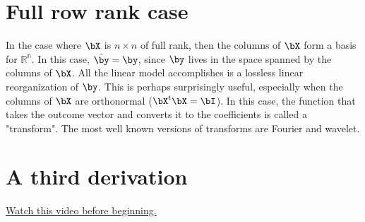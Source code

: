 \section{Full row rank case}

In the case where $\bX$ is $n\times n$ of full rank,
then the columns of $\bX$ form a basis for $\mathbb{R^n}$.
In this case, $\hat \by = \by$, since $\by$ lives
in the space spanned by the columns of $\bX$. All
the linear model accomplishes is a lossless 
linear reorganization of $\by$. This is perhaps surprisingly
useful, especially when the columns of $\bX$ are
orthonormal ($\bX^t\bX = \bI$). In this case, the
function that takes the outcome vector and converts
it to the coefficients is called a "transform". The
most well known versions of transforms are Fourier and
wavelet. 

\section{A third derivation}

\href{https://www.youtube.com/watch?v=7_-ztDF4cwk&index=26&list=PLpl-gQkQivXhdgUCdaUQcdb31CRe8Mm2y}{Watch this video before beginning.}

